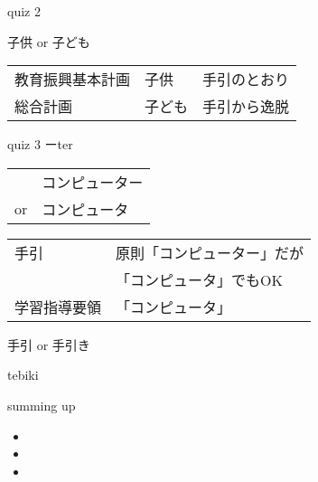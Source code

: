 \documentclass[
  ignorenonframetext,
]{beamer}
\begin{document}
\begin{frame}{quiz 2}
\protect\hypertarget{quiz-2}{}
\Huge

子供 or 子ども \pause

\bigskip

\large

\raggedleft
\begin{tabular}{@{}lll@{}}\toprule
教育振興基本計画&子供&手引のとおり\\\pause
総合計画&子ども&手引から逸脱\\\bottomrule
\end{tabular}
\pause

\vfill
\end{frame}

\begin{frame}{quiz 3 ーter}
\protect\hypertarget{quiz-3-ux30fcter}{}
\Huge

\begin{tabular}{@{}ll@{}}
&コンピューター\\
or&コンピュータ
\end{tabular}

\pause

\vfill

\large
\raggedleft
\begin{tabular}{@{}ll@{}}\toprule
手引&原則「コンピューター」だが\\
&「コンピュータ」でもOK\\\pause
学習指導要領&「コンピュータ」\\\bottomrule
\end{tabular}
\pause

\vfill
\end{frame}

\begin{frame}{手引 or 手引き}
\protect\hypertarget{ux624bux5f15-or-ux624bux5f15ux304d}{}
\end{frame}

\begin{frame}{tebiki}
\protect\hypertarget{tebiki-1}{}
\vspace*{-20pt}
\end{frame}

\begin{frame}{summing up}
\protect\hypertarget{summing-up}{}
\Huge

\begin{itemize}
\item  \scalebox{1.4}{根拠}\pause
\item  \scalebox{1.4}{簡潔さ}\pause
\item  \scalebox{1.4}{スピード感}
\end{itemize}
\end{frame}
\end{document}
